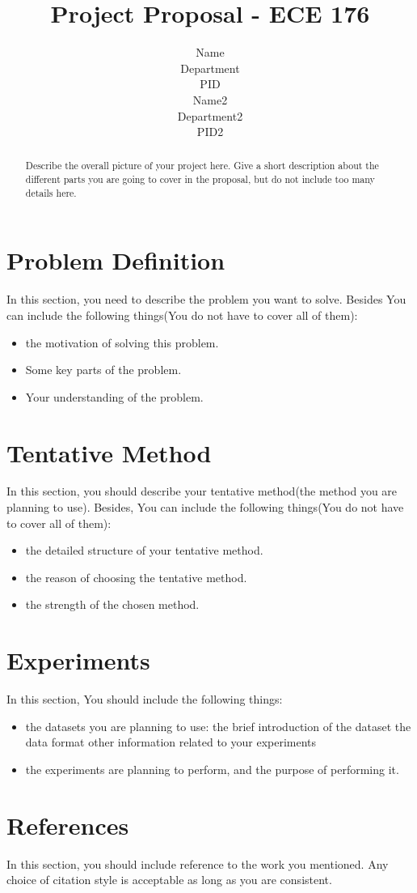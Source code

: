 \documentclass{article}
\title{Project Proposal - ECE 176}
\author{%
  Name \\
  Department\\
  PID\\
  \And
  Name2 \\
  Department2 \\
  PID2 \\
}
\begin{document}
\maketitle

\begin{abstract}
    Describe the overall picture of your project here. Give a short description about the different parts you are going to cover in the proposal, but do not include too many details here.
\end{abstract}

\section{Problem Definition}

In this section, you need to describe the problem you want to solve. Besides You can include the following things(You do not have to cover all of them):
\begin{itemize}
    \item the motivation of solving this problem.
    \item Some key parts of the problem.
    \item Your understanding of the problem.
\end{itemize}

\section{Tentative Method}

In this section, you should describe your tentative method(the method you are planning to use). Besides, You can include the following things(You do not have to cover all of them): 

\begin{itemize}
    \item the detailed structure of your tentative method.
    \item the reason of choosing the tentative method.
    \item the strength of the chosen method.
\end{itemize}

\section{Experiments}

In this section, You should include the following things:

\begin{itemize}
    \item the datasets you are planning to use:
        \subitem the brief introduction of the dataset
        \subitem the data format
        \subitem other information related to your experiments
    \item the experiments are planning to perform, and the purpose of performing it.
\end{itemize}


\section*{References}

In this section, you should include reference to the work you mentioned. Any choice of citation style is acceptable as long as you are consistent.
\end{document}
